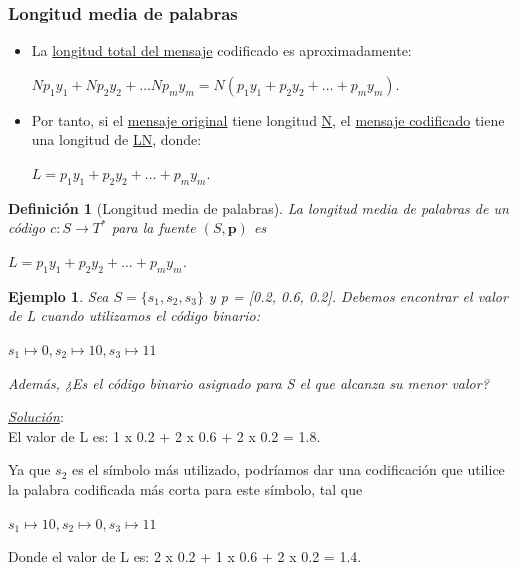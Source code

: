 \documentclass{beamer}
\newtheorem{ejemplo} [Ejemplo] {Ejemplo}
\newtheorem{definicion} [Definicion]{Definición}
\begin{document}
\begin{frame} \frametitle{Longitud media de palabras} \small

\begin{itemize}

\item  La \underline{longitud total del mensaje} codificado es aproximadamente:


\begin{center}
$Np_1y_1 + Np_2y_2 + \ldots Np_my_m	= N(p_1y_1 + p_2y_2 + \ldots + p_my_m).$
\end{center}

\item Por tanto, si el \underline{mensaje original} tiene longitud \underline{N}, el \underline{mensaje codificado} tiene una longitud de \underline{LN}, donde:
\begin{center}
$L=p_1y_1+p_2y_2+ \ldots +p_my_m$.
\end{center}

\end{itemize}

\begin{definicion}[Longitud media de palabras]
La longitud media de palabras de un código $c: S\rightarrow T^{*}$ para la fuente $(S, \mathbf{p})$ es 

\begin{center}$L=p_1y_1+p_2y_2+ \ldots +p_my_m$.\end{center}

\end{definicion}




\end{frame} 
\begin{frame}  \small

\begin{ejemplo}

Sea $S=\{s_1,s_2,s_3\}$ y p = [0.2, 0.6, 0.2]. Debemos encontrar el valor de L cuando utilizamos el código binario:
\begin{center} $s_{1}  \mapsto 0, s_{2}  \mapsto 10, s_{3}  \mapsto 11$\end{center}
Además, ¿Es el código binario asignado para S el que alcanza su menor valor?
\end{ejemplo}

\pause

\underline{\textit{Solución}}:\\

 El valor de L es: 1 x 0.2 + 2 x 0.6 + 2 x 0.2 = 1.8.

Ya que $s_2$ es el símbolo más utilizado, podríamos dar una codificación que utilice la palabra codificada más corta para este símbolo, tal que 
\begin{center} $s_{1}  \mapsto 10, s_{2}  \mapsto 0, s_{3}  \mapsto 11$\end{center}
		
Donde el valor de L es: 2 x 0.2 + 1 x 0.6 + 2 x 0.2 = 1.4. 

\end{frame} 
\end{document}
